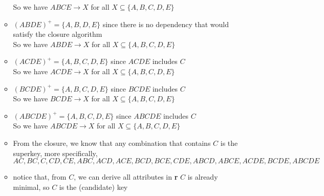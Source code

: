 \documentclass[12pt]{article}
\begin{document}
\begin{enumerate}
\begin{itemize}
                So we have $ABCE \longrightarrow X$ for all $X \subseteq \{A, B,
                C, D, E\}$
          \item $(ABDE)^+ = \{A, B, D, E\}$ since there is no dependency that
                would satisfy the closure algorithm \\
                So we have $ABDE \longrightarrow X$ for all $X \subseteq \{A, B,
                C, D, E\}$
          \item $(ACDE)^+ = \{A, B, C, D, E\}$ since $ACDE$ includes $C$ \\
                So we have $ACDE \longrightarrow X$ for all $X \subseteq \{A, B,
                C, D, E\}$
          \item $(BCDE)^+ = \{A, B, C, D, E\}$ since $BCDE$ includes $C$ \\
                So we have $BCDE \longrightarrow X$ for all $X \subseteq \{A, B,
                C, D, E\}$
          \item $(ABCDE)^+ = \{A, B, C, D, E\}$ since $ABCDE$ includes $C$ \\
                So we have $ABCDE \longrightarrow X$ for all $X \subseteq \{A,
                B, C, D, E\}$
          \item From the closure, we know that any combination that contains $C$
                is the superkey, more specifically, $AC, BC, C, CD, CE, ABC,
                ACD, ACE, BCD, BCE, CDE, ABCD, ABCE, ACDE, BCDE, ABCDE$
          \item notice that, from $C$, we can derive all attributes in
                \textbf{r} $C$ is already minimal, so $C$ is the (candidate) key
        \end{itemize}
  \ \\


\end{enumerate}
\end{document}
